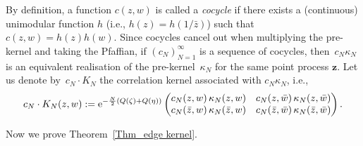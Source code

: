 \documentclass[pdftex]{sigma}
\numberwithin{equation}{section}
\newcommand{\1}{\chi}
\begin{document}
By definition, a function $c(z,w)$ is called a \textit{cocycle} if there exists a (continuous) unimodular function $h$ (i.e., $h(z)=h(1/\bar{z})$) such that $c(z,w) = h(z)h(w).$ Since cocycles cancel out when multiplying the pre-kernel and taking the Pfaffian, if $(c_N)_{N=1}^\infty$ is a sequence of cocycles, then~$c_N\kappa_N$ is an equivalent realisation of the pre-kernel~$\kappa_N$
for the same point process $\boldsymbol{z}$. Let us denote by~$c_N \cdot K_N$ the correlation kernel associated with $c_N \kappa_N$, i.e.,
\begin{gather*}
c_N \cdot K_N(z,w):= {\rm e}^{ -\frac{N}{2} (Q( \zeta )+Q( \eta )) } \begin{pmatrix}
	 c_N(z,w)\, \kappa_N(z,w) & c_N(z,\bar{w})\, \kappa_N(z,\bar{w}) \\
	c_N(\bar{z},w)\, \kappa_N(\bar{z},w) & c_N(\bar{z},\bar{w}) \, \kappa_N(\bar{z},\bar{w})
	\end{pmatrix}.
\end{gather*}

Now we prove Theorem~\ref{Thm_edge kernel}.
\end{document}
